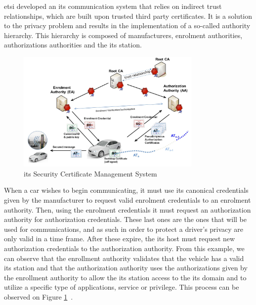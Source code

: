 \gls{etsi} developed an \gls{its} communication system that relies on indirect trust relationships, which are built upon trusted third party certificates. It is a solution to the privacy problem and results in the implementation of a so-called authority hierarchy. This hierarchy is composed of manufacturers, enrolment authorities, authorizations authorities and the \gls{its} station.

\begin{figure}[htbp]
    \centering
    \includegraphics[width=0.8\textwidth]{Chapters/Figures/VANETs/pki.png}
   	\caption{\gls{its} Security Certificate Management System~\cite{etsi_intelligent_2018}}
   	\label{fig:pki}
\end{figure}


When a car wishes to begin communicating, it must use its canonical credentials given by the manufacturer to request valid enrolment credentials to an enrolment authority. Then, using the enrolment credentials it must request an authorization authority for authorization credentials. These last ones are the ones that will be used for communications, and as such in order to protect a driver's privacy are only valid in a time frame. After these expire, the \gls{its} host must request new authorization credentials to the authorization authority.
From this example, we can observe that the enrollment authority validates that the vehicle has a valid \gls{its} station and that the authorization authority uses the authorizations given by the enrollment authority to allow the \gls{its} station access to the \gls{its} domain and to utilize a specific type of applications, service or privilege. This process can be observed on Figure \ref{fig:pki}~\cite{etsi_intelligent_2021}.



